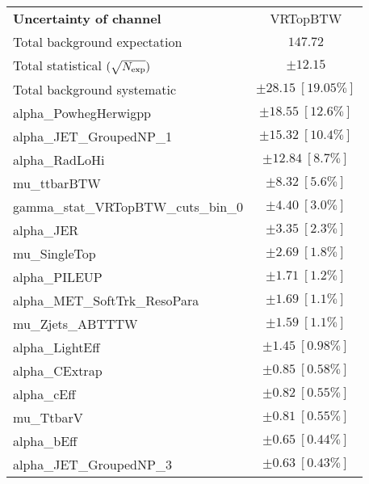
\begin{table}
\begin{center}
\setlength{\tabcolsep}{0.0pc}
\begin{tabular*}{\textwidth}{@{\extracolsep{\fill}}lc}
\noalign{\smallskip}\hline\noalign{\smallskip}
{\bf Uncertainty of channel}                                    & VRTopBTW            \\
\noalign{\smallskip}\hline\noalign{\smallskip}
Total background expectation             &  $147.72$       \\
\noalign{\smallskip}\hline\noalign{\smallskip}
Total statistical $(\sqrt{N_{\rm exp}})$              & $\pm 12.15$       \\
Total background systematic               & $\pm 28.15\ [19.05\%] $             \\
\noalign{\smallskip}\hline\noalign{\smallskip}
\noalign{\smallskip}\hline\noalign{\smallskip}
alpha\_PowhegHerwigpp         & $\pm 18.55\ [12.6\%] $       \\
alpha\_JET\_GroupedNP\_1         & $\pm 15.32\ [10.4\%] $       \\
alpha\_RadLoHi         & $\pm 12.84\ [8.7\%] $       \\
mu\_ttbarBTW         & $\pm 8.32\ [5.6\%] $       \\
gamma\_stat\_VRTopBTW\_cuts\_bin\_0         & $\pm 4.40\ [3.0\%] $       \\
alpha\_JER         & $\pm 3.35\ [2.3\%] $       \\
mu\_SingleTop         & $\pm 2.69\ [1.8\%] $       \\
alpha\_PILEUP         & $\pm 1.71\ [1.2\%] $       \\
alpha\_MET\_SoftTrk\_ResoPara         & $\pm 1.69\ [1.1\%] $       \\
mu\_Zjets\_ABTTTW         & $\pm 1.59\ [1.1\%] $       \\
alpha\_LightEff         & $\pm 1.45\ [0.98\%] $       \\
alpha\_CExtrap         & $\pm 0.85\ [0.58\%] $       \\
alpha\_cEff         & $\pm 0.82\ [0.55\%] $       \\
mu\_TtbarV         & $\pm 0.81\ [0.55\%] $       \\
alpha\_bEff         & $\pm 0.65\ [0.44\%] $       \\
alpha\_JET\_GroupedNP\_3         & $\pm 0.63\ [0.43\%] $       \\

\end{tabular*}
\end{center}
\end{table}
